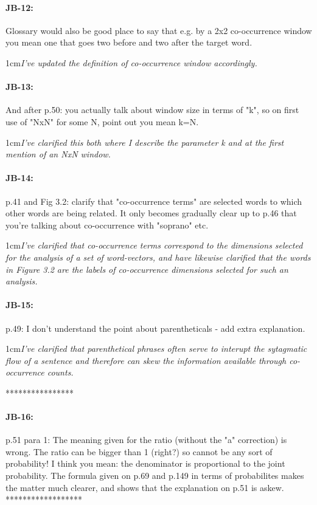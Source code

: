 \documentclass[11pt,a4paper]{article}
\newcommand{\res}[1]{\vspace{0.25cm} \begin{adjustwidth}{1cm}{}\emph{#1}\end{adjustwidth}}
\begin{document}
\paragraph{JB-12:} Glossary would also be good place to say that e.g. by a 2x2 co-occurrence window you mean one that goes two before and two after the target word.

\res{I've updated the definition of co-occurrence window accordingly.}

\paragraph{JB-13:} And after p.50: you actually talk about window size in terms of "k", so on first use of "NxN" for some N, point out you mean k=N.

\res{I've clarified this both where I describe the parameter k and at the first mention of an NxN window.}

\paragraph{JB-14:} p.41 and Fig 3.2: clarify that "co-occurrence terms" are selected words to which other words are being related. It only becomes gradually clear up to p.46 that you're talking about co-occurrence with "soprano" etc.

\res{I've clarified that co-occurrence terms correspond to the dimensions selected for the analysis of a set of word-vectors, and have likewise clarified that the words in Figure 3.2 are the labels of co-occurrence dimensions selected for such an analysis.}

\paragraph{JB-15:} p.49: I don't understand the point about parentheticals - add extra explanation.

\res{I've clarified that parenthetical phrases often serve to interupt the sytagmatic flow of a sentence and therefore can skew the information available through co-occurrence counts.}

****************
\paragraph{JB-16:} p.51 para 1: The meaning given for the ratio (without the "a" correction) is wrong. The ratio can be bigger than 1 (right?) so cannot be any sort of probability! I think you mean: the denominator is proportional to the joint probability. The formula given on p.69 and p.149 in terms of probabilites makes the matter much clearer, and shows that the explanation on p.51 is askew.
******************
\end{document}
